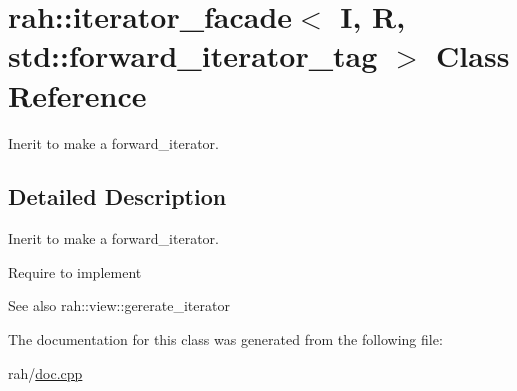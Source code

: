 \hypertarget{classrah_1_1iterator__facade_3_01_i_00_01_r_00_01std_1_1forward__iterator__tag_01_4}{}\section{rah\+::iterator\+\_\+facade$<$ I, R, std\+::forward\+\_\+iterator\+\_\+tag $>$ Class Reference}
\label{classrah_1_1iterator__facade_3_01_i_00_01_r_00_01std_1_1forward__iterator__tag_01_4}


Inerit to make a forward\+\_\+iterator.  




\subsection{Detailed Description}
Inerit to make a forward\+\_\+iterator. 

Require to implement 
\begin{DoxyCode}{0}
\end{DoxyCode}
 \begin{DoxySeeAlso}{See also}
rah\+::view\+::gererate\+\_\+iterator 
\end{DoxySeeAlso}


The documentation for this class was generated from the following file\+:\begin{DoxyCompactItemize}
\item 
rah/\mbox{\hyperlink{doc_8cpp}{doc.\+cpp}}\end{DoxyCompactItemize}
